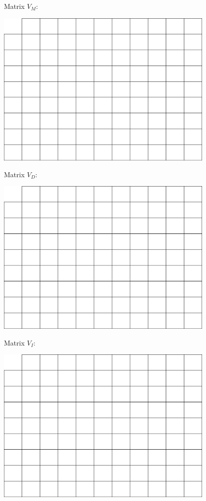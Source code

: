 \documentclass[a4paper,11pt]{article}
\begin{document}
Matrix $V_M$:
\begin{center}
\includegraphics[width=0.8\textwidth]{matrix.png}
\end{center}
\vspace{1.5cm}

Matrix $V_D$:
\begin{center}
\includegraphics[width=0.8\textwidth]{matrix.png}
\end{center}
\vspace{1.5cm}

\newpage 

Matrix $V_I$: 
\begin{center}
\includegraphics[width=0.8\textwidth]{matrix.png}
\end{center}
\vspace{0.5cm}
\end{document}
